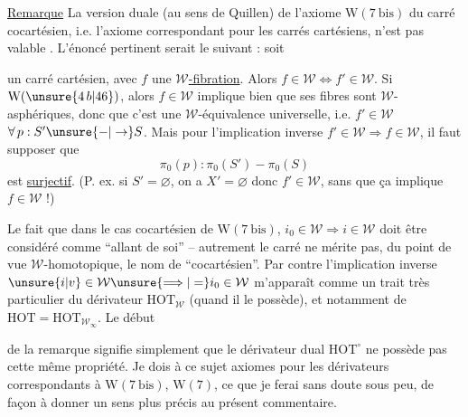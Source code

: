 
\uline{Remarque} La version duale  (au sens de
Quillen) de l'axiome $\mathrm{W}(7\ \mathrm{bis})$ du carré cocartésien, i.e. l'axiome correspondant pour les
carrés cartésiens, n'est pas valable  .
L'énoncé pertinent serait le suivant : soit


un carré cartésien, avec $f$ une \uline{$\mathcal W$-fibration}.
Alors $f\in\mathcal W\Longleftrightarrow f'\in\mathcal W$. Si  \unsure{:}  $\mathrm W(\unsure{4\,b|46})$, alors $f\in\mathcal W$ implique
bien que ses fibres sont $\mathcal W$-asphériques, donc
que c'est une $\mathcal W$-équivalence universelle, i.e. $f'\in\mathcal W$
$\forall\,p:S'\unsure{-|\to}S$. Mais pour l'implication inverse
$f'\in\mathcal W\Rightarrow f\in\mathcal W$, il faut supposer  que
\[
\pi_0(p):\pi_0(S')- \pi_0(S)
\]
est \uline{surjectif}. (P. ex. si $S'=\varnothing$, on a $X'=\varnothing$
donc $f'\in\mathcal W$, sans que ça implique $f\in\mathcal W$ !)

Le fait que dans le cas cocartésien de
$\mathrm W(7\ \mathrm{bis})$, $i_0\in\mathcal W\Rightarrow i\in\mathcal W$ doit être considéré
comme ``allant de soi'' -- autrement le carré
ne mérite pas, du point de vue $\mathcal W$-homotopique, le nom de ``cocartésien''. Par contre
l'implication inverse $\unsure{i|v}\in\mathcal W\unsure{\Longrightarrow|=}i_0\in\mathcal W$ m'apparaît comme un trait très particulier
du dérivateur $\mathrm{HOT}_{\mathcal W}$ (quand il le possède), et
notamment de $\mathrm{HOT}=\mathrm{HOT}_{\mathcal W_\infty}$. Le début


de la remarque  signifie simplement que
le dérivateur dual $\mathrm{HOT}^{\circ}$ ne possède
pas cette même propriété. Je dois  à ce
sujet   axiomes pour les dérivateurs correspondants à $\mathrm W(7\ \mathrm{bis})$, $\mathrm W(7)$, ce que je ferai
sans doute sous peu, de façon à donner
un sens plus précis au présent commentaire.

